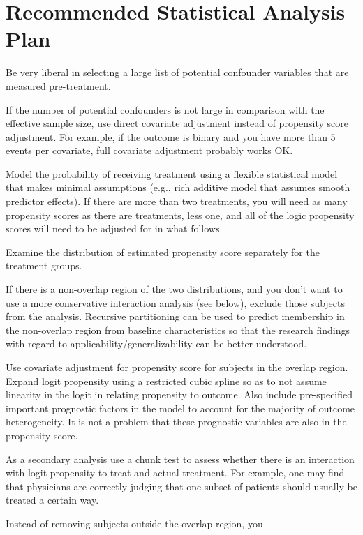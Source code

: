 \section{Recommended Statistical Analysis Plan}
\be
\item Be very liberal in selecting a large list of potential
  confounder variables that are measured pre-treatment.
\item If the number of potential confounders is not large in
  comparison with the effective sample size, use direct covariate
  adjustment instead of propensity score adjustment.  For example, if
  the outcome is binary and you have more than 5 events per covariate,
  full covariate adjustment probably works OK.
\item Model the probability of receiving treatment using a flexible
  statistical model that makes minimal assumptions (e.g., rich
  additive model that assumes smooth predictor effects).  If there are
  more than two treatments, you will need as many propensity scores as
  there are treatments, less one, and all of the logic propensity
  scores will need to be adjusted for in what follows.
\item Examine the distribution of estimated propensity score
  separately for the treatment groups. 
\item If there is a non-overlap region of the two distributions, and
  you don't want to use a more conservative interaction analysis (see
  below), exclude those subjects from the analysis.  Recursive
  partitioning can be used to predict membership in the non-overlap
  region from baseline characteristics so that the research findings
  with regard to applicability/generalizability can be better
  understood. 
\item Use covariate adjustment for propensity score for subjects in
  the overlap region.  Expand logit propensity using a restricted
  cubic spline so as to not assume linearity in the logit in relating
  propensity to outcome. Also include pre-specified important
  prognostic factors in the model to account for the majority of
  outcome heterogeneity.  It is not a problem that these prognostic
  variables are also in the propensity score.
\item As a secondary analysis use a chunk test to assess whether there
  is an interaction with logit propensity to treat and actual treatment.
  For example, one may find that physicians are correctly judging that
  one subset of patients should usually be treated a certain way.
\item Instead of removing subjects outside the overlap region, you
